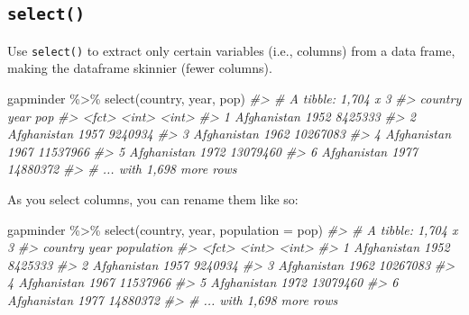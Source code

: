 \documentclass[
]{book}
\newenvironment{Shaded}{\begin{snugshade}}{\end{snugshade}}
\newcommand{\AttributeTok}[1]{\textcolor[rgb]{0.77,0.63,0.00}{#1}}
\newcommand{\CommentTok}[1]{\textcolor[rgb]{0.56,0.35,0.01}{\textit{#1}}}
\newcommand{\FunctionTok}[1]{\textcolor[rgb]{0.00,0.00,0.00}{#1}}
\newcommand{\NormalTok}[1]{#1}
\newcommand{\SpecialCharTok}[1]{\textcolor[rgb]{0.00,0.00,0.00}{#1}}
\begin{document}
\hypertarget{select}{%
\subsection*{\texorpdfstring{\texttt{select()}}{select()}}\label{select}}

Use \texttt{select()} to extract only certain variables (i.e., columns) from a data frame, making the dataframe skinnier (fewer columns).

\begin{Shaded}
\begin{Highlighting}[]
\NormalTok{gapminder }\SpecialCharTok{\%\textgreater{}\%} \FunctionTok{select}\NormalTok{(country, year, pop)}
\CommentTok{\#\textgreater{} \# A tibble: 1,704 x 3}
\CommentTok{\#\textgreater{}   country      year      pop}
\CommentTok{\#\textgreater{}   \textless{}fct\textgreater{}       \textless{}int\textgreater{}    \textless{}int\textgreater{}}
\CommentTok{\#\textgreater{} 1 Afghanistan  1952  8425333}
\CommentTok{\#\textgreater{} 2 Afghanistan  1957  9240934}
\CommentTok{\#\textgreater{} 3 Afghanistan  1962 10267083}
\CommentTok{\#\textgreater{} 4 Afghanistan  1967 11537966}
\CommentTok{\#\textgreater{} 5 Afghanistan  1972 13079460}
\CommentTok{\#\textgreater{} 6 Afghanistan  1977 14880372}
\CommentTok{\#\textgreater{} \# ... with 1,698 more rows}
\end{Highlighting}
\end{Shaded}

As you select columns, you can rename them like so:

\begin{Shaded}
\begin{Highlighting}[]
\NormalTok{gapminder }\SpecialCharTok{\%\textgreater{}\%} \FunctionTok{select}\NormalTok{(country, year, }\AttributeTok{population =}\NormalTok{ pop)}
\CommentTok{\#\textgreater{} \# A tibble: 1,704 x 3}
\CommentTok{\#\textgreater{}   country      year population}
\CommentTok{\#\textgreater{}   \textless{}fct\textgreater{}       \textless{}int\textgreater{}      \textless{}int\textgreater{}}
\CommentTok{\#\textgreater{} 1 Afghanistan  1952    8425333}
\CommentTok{\#\textgreater{} 2 Afghanistan  1957    9240934}
\CommentTok{\#\textgreater{} 3 Afghanistan  1962   10267083}
\CommentTok{\#\textgreater{} 4 Afghanistan  1967   11537966}
\CommentTok{\#\textgreater{} 5 Afghanistan  1972   13079460}
\CommentTok{\#\textgreater{} 6 Afghanistan  1977   14880372}
\CommentTok{\#\textgreater{} \# ... with 1,698 more rows}
\end{Highlighting}
\end{Shaded}
\end{document}
